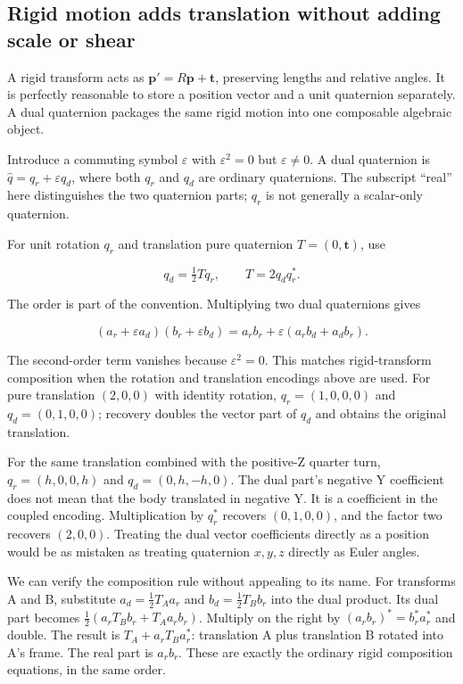 \subsection{Rigid motion adds translation without adding scale or shear}\label{rigid-motion-adds-translation-without-adding-scale-or-shear}

A rigid transform acts as \(\mathbf p'=R\mathbf p+\mathbf t\), preserving lengths and relative angles. It is perfectly reasonable to store a position vector and a unit quaternion separately. A dual quaternion packages the same rigid motion into one composable algebraic object.

Introduce a commuting symbol \(\varepsilon\) with \(\varepsilon^2=0\) but \(\varepsilon\ne0\). A dual quaternion is \(\widehat q=q_r+\varepsilon q_d\), where both \(q_r\) and \(q_d\) are ordinary quaternions. The subscript ``real'' here distinguishes the two quaternion parts; \(q_r\) is not generally a scalar-only quaternion.

For unit rotation \(q_r\) and translation pure quaternion \(T=(0,\mathbf t)\), use

\[
q_d=\tfrac12Tq_r,\qquad T=2q_dq_r^*.
\]

The order is part of the convention. Multiplying two dual quaternions gives

\[
(a_r+\varepsilon a_d)(b_r+\varepsilon b_d)
=a_rb_r+\varepsilon(a_rb_d+a_db_r).
\]

The second-order term vanishes because \(\varepsilon^2=0\). This matches rigid-transform composition when the rotation and translation encodings above are used. For pure translation \((2,0,0)\) with identity rotation, \(q_r=(1,0,0,0)\) and \(q_d=(0,1,0,0)\); recovery doubles the vector part of \(q_d\) and obtains the original translation.

For the same translation combined with the positive-Z quarter turn, \(q_r=(h,0,0,h)\) and \(q_d=(0,h,-h,0)\). The dual part's negative Y coefficient does not mean that the body translated in negative Y. It is a coefficient in the coupled encoding. Multiplication by \(q_r^*\) recovers \((0,1,0,0)\), and the factor two recovers \((2,0,0)\). Treating the dual vector coefficients directly as a position would be as mistaken as treating quaternion \(x,y,z\) directly as Euler angles.

We can verify the composition rule without appealing to its name. For transforms A and B, substitute \(a_d=\tfrac12T_Aa_r\) and \(b_d=\tfrac12T_Bb_r\) into the dual product. Its dual part becomes \(\tfrac12(a_rT_Bb_r+T_Aa_rb_r)\). Multiply on the right by \((a_rb_r)^*=b_r^*a_r^*\) and double. The result is \(T_A+a_rT_Ba_r^*\): translation A plus translation B rotated into A's frame. The real part is \(a_rb_r\). These are exactly the ordinary rigid composition equations, in the same order.

